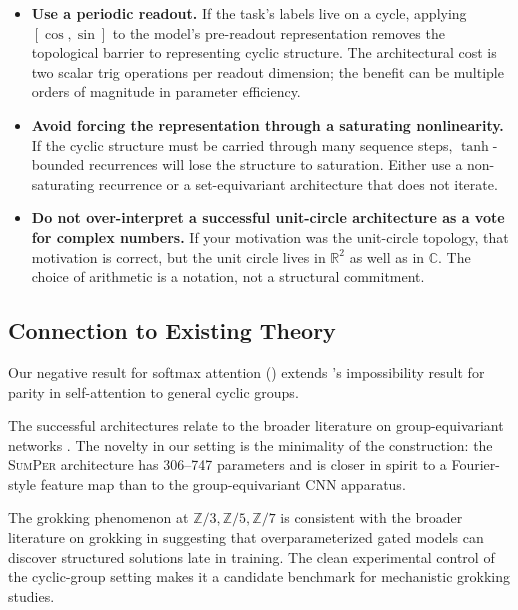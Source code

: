 \documentclass[11pt]{article}
\theoremstyle{definition}
\newcommand{\R}{\mathbb{R}}
\newcommand{\C}{\mathbb{C}}
\newcommand{\Z}{\mathbb{Z}}
\begin{document}
\begin{itemize}[itemsep=2pt]
\item \textbf{Use a periodic readout.} If the task's labels live on
a cycle, applying $[\cos, \sin]$ to the model's pre-readout
representation removes the topological barrier to representing
cyclic structure. The architectural cost is two scalar trig
operations per readout dimension; the benefit can be
multiple orders of magnitude in parameter efficiency.

\item \textbf{Avoid forcing the representation through a saturating
nonlinearity.} If the cyclic structure must be carried through many
sequence steps, $\tanh$-bounded recurrences will lose the structure
to saturation. Either use a non-saturating recurrence or a
set-equivariant architecture that does not iterate.

\item \textbf{Do not over-interpret a successful unit-circle
architecture as a vote for complex numbers.} If your motivation
was the unit-circle topology, that motivation is correct, but the
unit circle lives in $\R^2$ as well as in $\C$. The choice of
arithmetic is a notation, not a structural commitment.
\end{itemize}

\subsection{Connection to Existing Theory}

Our negative result for softmax attention
() extends
\citet{hahn2020theoretical}'s impossibility result for parity in
self-attention to general cyclic groups.

The successful architectures relate to the broader literature on
group-equivariant networks \citep{cohen2016group}. The novelty in
our setting is the minimality of the construction: the
\textsc{SumPer} architecture has 306--747 parameters and is closer
in spirit to a Fourier-style feature map than to the
group-equivariant CNN apparatus.

The grokking phenomenon at $\Z/3, \Z/5, \Z/7$ is consistent with
the broader literature on grokking
\citep{power2022grokking, nanda2023progress} in suggesting that
overparameterized gated models can discover structured solutions
late in training. The clean experimental control of the cyclic-group
setting makes it a candidate benchmark for mechanistic grokking
studies.
\end{document}
